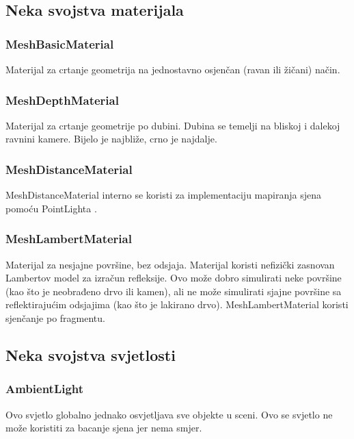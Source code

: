 \documentclass[a4paper,12pt]{article}
\begin{document}
\subsection{Neka svojstva materijala}
\subsubsection{MeshBasicMaterial}

\hspace{10mm} Materijal za crtanje geometrija na jednostavno osjenčan (ravan ili žičani) način.

\subsubsection{MeshDepthMaterial}
\hspace{10mm} Materijal za crtanje geometrije po dubini. Dubina se temelji na bliskoj i dalekoj ravnini kamere. Bijelo je najbliže, crno je najdalje.

\subsubsection{MeshDistanceMaterial}
\hspace{10mm} MeshDistanceMaterial interno se koristi za implementaciju mapiranja sjena pomoću PointLighta .

\subsubsection{MeshLambertMaterial}
Materijal za nesjajne površine, bez odsjaja.
Materijal koristi nefizički zasnovan Lambertov model za izračun refleksije. Ovo može dobro simulirati neke površine (kao što je neobrađeno drvo ili kamen), ali ne može simulirati sjajne površine sa reflektirajućim odsjajima (kao što je lakirano drvo). MeshLambertMaterial koristi sjenčanje po fragmentu.

\pagebreak
\subsection{Neka svojstva svjetlosti}
\subsubsection{AmbientLight}
\hspace{10mm} Ovo svjetlo globalno jednako osvjetljava sve objekte u sceni.
Ovo se svjetlo ne može koristiti za bacanje sjena jer nema smjer.
\end{document}
